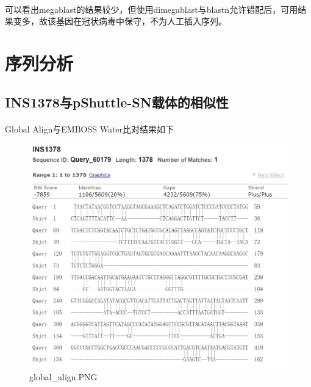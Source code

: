 \documentclass[supercite]{HustGraduPaper}
\begin{document}
		\paragraph{}\label{subpara:subpara}可以看出megablast的结果较少，但使用dimegablast与blastn允许错配后，可用结果变多，故该基因在冠状病毒中保守，不为人工插入序列。

	\section{序列分析}
	\subsection{INS1378与pShuttle-SN载体的相似性}
    \paragraph{}\label{subpara:subpara}Global Align与EMBOSS Water比对结果如下
		\begin{figure}[H]
			\centering
			\includegraphics[width=1\textwidth]{./material/practice2/global_align.png}
			\caption{global\_align.PNG}
		\end{figure}
\end{document}
